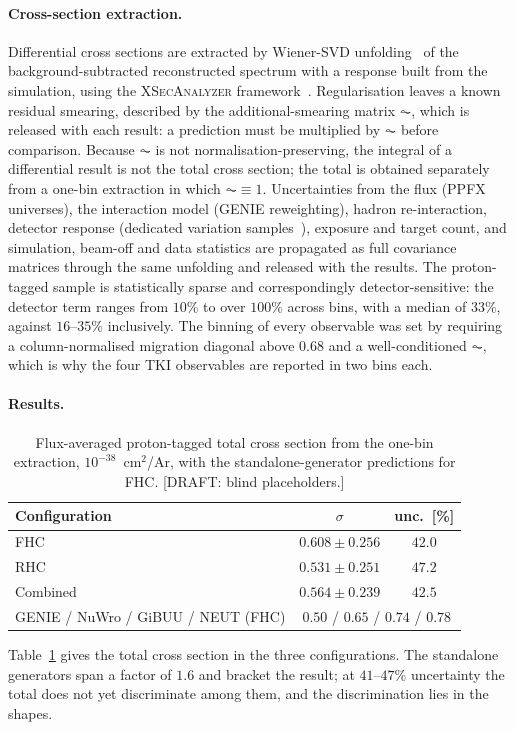 \documentclass[aps,prl,twocolumn,superscriptaddress,nofootinbib,floatfix]{revtex4-2}
\begin{document}
\paragraph*{Cross-section extraction.}
Differential cross sections are extracted by Wiener-SVD unfolding~\cite{wienervsd} of the
background-subtracted reconstructed spectrum with a response built from the simulation, using the
\textsc{XSecAnalyzer} framework~\cite{xsec_analyzer}. Regularisation leaves a known residual
smearing, described by the additional-smearing matrix $\AC$, which is released with each result: a
prediction must be multiplied by $\AC$ before comparison. Because $\AC$ is not
normalisation-preserving, the integral of a differential result is not the total cross section;
the total is obtained separately from a one-bin extraction in which $\AC\equiv1$. Uncertainties
from the flux (PPFX universes), the interaction model (GENIE reweighting), hadron re-interaction,
detector response (dedicated variation samples~\cite{uboone_detvar}), exposure and target count,
and simulation, beam-off and data statistics are propagated as full covariance matrices through
the same unfolding and released with the results. The proton-tagged sample is statistically
sparse and correspondingly detector-sensitive: the detector term ranges from $10\%$ to over
$100\%$ across bins, with a median of $33\%$, against $16$--$35\%$ inclusively. The binning of every
observable was set by requiring a column-normalised migration diagonal above $0.68$ and a
well-conditioned $\AC$, which is why the four TKI observables are reported in two bins each.

\paragraph*{Results.}
\begin{table}[b]
  \caption{Flux-averaged proton-tagged total cross section from the one-bin extraction,
    $10^{-38}$~cm$^2$/Ar, with the standalone-generator predictions for FHC. [DRAFT: blind
    placeholders.]}
  \label{tab:total1p}
  \begin{ruledtabular}
  \begin{tabular}{lcc}
    Configuration & $\sigma$ & unc.\ [\%] \\
    \hline
    FHC & $0.608\pm0.256$ & $42.0$ \\
    RHC & $0.531\pm0.251$ & $47.2$ \\
    Combined & $0.564\pm0.239$ & $42.5$ \\
    \hline
    GENIE / NuWro / GiBUU / NEUT (FHC) & \multicolumn{2}{c}{$0.50$ / $0.65$ / $0.74$ / $0.78$} \\
  \end{tabular}
  \end{ruledtabular}
\end{table}
Table~\ref{tab:total1p} gives the total cross section in the three configurations. The
standalone generators span a factor of $1.6$ and bracket the result; at $41$--$47\%$ uncertainty
the total does not yet discriminate among them, and the discrimination lies in the shapes.
\end{document}
